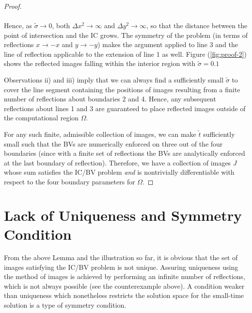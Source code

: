 \documentclass[10pt]{article}
\begin{document}
\begin{proof}
\begin{enumerate}[i)]
\begin{align*}
    \end{align*}
    Hence, as $\tilde{\sigma} \to 0$, both $\Delta x^2 \to \infty$ and
    $\Delta y^2 \to \infty$, so that the distance between the point of
    intersection and the IC grows. The symmetry of the problem (in
    terms of reflections $x \to -x$ and $y \to -y$) makes the argument
    applied to line 3 and the line of reflection applicable to the
    extension of line 1 as well. Figure (\ref{fig:proof-2}) shows the
    reflected images falling within the interior region with
    $\tilde{\sigma} = 0.1$
  \end{enumerate}
  Observations ii) and iii) imply that we can always find a
  sufficiently small $\tilde{\sigma}$ to cover the line segment
  containing the positions of images resulting from a finite number of
  reflections about boundaries 2 and 4.  Hence, any subsequent
  reflections about lines 1 and 3 are guaranteed to place reflected
  images outside of the computational region $\Omega$.

  For any such finite, admissible collection of images, we can make
  $\tilde{t}$ sufficiently small such that the BVs are numerically
  enforced on three out of the four boundaries (since with a finite
  set of reflections the BVs are analytically enforced at the last
  boundary of reflection). Therefore, we have a collection of images
  $J$ whose sum satisfies the IC/BV problem \textit{and} is
  nontrivially differentiable with respect to the four boundary
  parameters for $\Omega$.
\end{proof}

\section{Lack of Uniqueness and Symmetry Condition}
From the above Lemma and the illustration so far, it is obvious that
the set of images satisfying the IC/BV problem is not unique. Assuring
uniqueness using the method of images is achieved by performing an
infinite number of reflections, which is not always possible (see the
counterexample above). A condition weaker than uniqueness which
nonetheless restricts the solution space for the small-time solution
is a type of symmetry condition.
\end{document}
